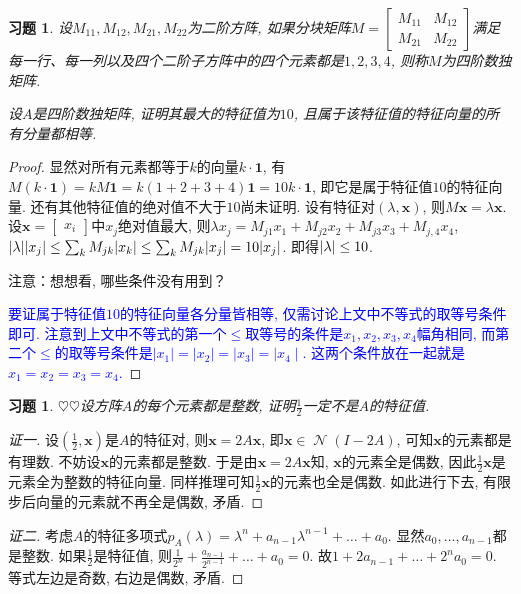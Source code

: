 \documentclass{ctexart}
\newtheorem{exercise}[thm]{习题}
\newcommand\bs[1]{\boldsymbol{ #1}}
\newcommand\hint[1]{\par {\footnotesize\kaishu 提示：#1}}
\newcommand\note[1]{\par {\footnotesize\kaishu 注意：#1}}
\def\hard{$\heartsuit$}
\DeclareMathOperator{\nullspace}{\mathcal{N}}
\DeclarePairedDelimiter\abs{|}{|}
\begin{document}
\begin{exercise}
设$M_{11},M_{12},M_{21},M_{22}$为二阶方阵, 如果分块矩阵$M=\begin{bmatrix}M_{11}&M_{12}\\M_{21}&M_{22}\end{bmatrix}$满足每一行、每一列以及四个二阶子方阵中的四个元素都是$1,2,3,4$, 则称$M$为四阶数独矩阵. 

设$A$是四阶数独矩阵, 证明其最大的特征值为$10$, 且属于该特征值的特征向量的所有分量都相等. 
\end{exercise}
\begin{proof}
	显然对所有元素都等于$k$的向量$k\cdot\bs 1$, 有$M(k\cdot \bs 1)=kM\bs 1=k(1+2+3+4)\bs 1=10k\cdot \bs 1$, 即它是属于特征值$10$的特征向量. 
	还有其他特征值的绝对值不大于$10$尚未证明. 
	设有特征对$(\lambda,\bs x)$, 则$M\bs x=\lambda \bs x$. 
	设$\bs x=\begin{bmatrix}
		x_i
	\end{bmatrix}$中$x_j$绝对值最大, 则$\lambda x_j=M_{j1}x_1+M_{j2}x_2+M_{j3}x_3+M_{j,4}x_4$, 
	$\abs{\lambda}\abs{x_j}
	\le \sum_{k}M_{jk}\abs{x_k}
	\le  \sum_{k}M_{jk}\abs{x_j}
	=10\abs{x_j}$. 即得$\abs{\lambda}\le 10$. 

	\note{想想看, 哪些条件没有用到？}

    \textcolor{blue}{要证属于特征值$10$的特征向量各分量皆相等, 仅需讨论上文中不等式的取等号条件即可. 注意到上文中不等式的第一个$\leq$取等号的条件是$x_1,x_2,x_3,x_4$幅角相同, 而第二个$\leq$的取等号条件是$\mid x_1\mid=\mid x_2\mid=\mid x_3\mid=\mid x_4\mid$. 这两个条件放在一起就是$x_1=x_2=x_3=x_4$.}
\end{proof}

\begin{exercise}
\hard\hard 设方阵$A$的每个元素都是整数, 证明$\frac{1}{2}$一定不是$A$的特征值. 

\end{exercise}
\begin{proof}[证一]
	设$(\frac{1}{2},\bs x)$是$A$的特征对, 则$\bs x=2A\bs x$, 即$\bs x\in\nullspace(I-2A)$, 可知$\bs x$的元素都是有理数. 
	不妨设$\bs x$的元素都是整数. 
	于是由$\bs x=2A\bs x$知, $\bs x$的元素全是偶数, 因此$\frac{1}{2}\bs x$是元素全为整数的特征向量. 
	同样推理可知$\frac{1}{2}\bs x$的元素也全是偶数. 
	如此进行下去, 有限步后向量的元素就不再全是偶数, 矛盾. 
\end{proof}
\begin{proof}[证二]
	考虑$A$的特征多项式$p_A(\lambda)=\lambda^n+a_{n-1}\lambda^{n-1}+\dots+a_0$. 显然$a_0,\dots,a_{n-1}$都是整数. 
	如果$\frac{1}{2}$是特征值, 则$\frac{1}{2^n}+\frac{a_{n-1}}{2^{n-1}}+\dots+a_0=0$. 
	故$1+2a_{n-1}+\dots+2^na_0=0$. 
	等式左边是奇数, 右边是偶数, 矛盾. 
\end{proof}
\end{document}

